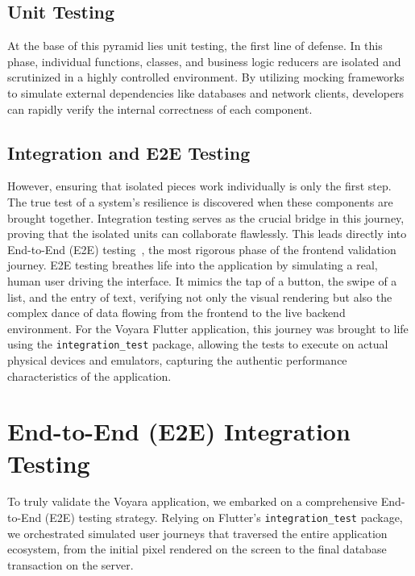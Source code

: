 \subsection{Unit Testing}
At the base of this pyramid lies unit testing, the first line of defense. In this phase, individual functions, classes, and business logic reducers are isolated and scrutinized in a highly controlled environment. By utilizing mocking frameworks to simulate external dependencies like databases and network clients, developers can rapidly verify the internal correctness of each component. 

\subsection{Integration and E2E Testing}
However, ensuring that isolated pieces work individually is only the first step. The true test of a system's resilience is discovered when these components are brought together. Integration testing serves as the crucial bridge in this journey, proving that the isolated units can collaborate flawlessly. This leads directly into End-to-End (E2E) testing~\cite{e2e_testing}, the most rigorous phase of the frontend validation journey. E2E testing breathes life into the application by simulating a real, human user driving the interface. It mimics the tap of a button, the swipe of a list, and the entry of text, verifying not only the visual rendering but also the complex dance of data flowing from the frontend to the live backend environment. For the Voyara Flutter application, this journey was brought to life using the \texttt{integration\_test} package, allowing the tests to execute on actual physical devices and emulators, capturing the authentic performance characteristics of the application.

\section{End-to-End (E2E) Integration Testing}
To truly validate the Voyara application, we embarked on a comprehensive End-to-End (E2E) testing strategy. Relying on Flutter's \texttt{integration\_test} package, we orchestrated simulated user journeys that traversed the entire application ecosystem, from the initial pixel rendered on the screen to the final database transaction on the server.

